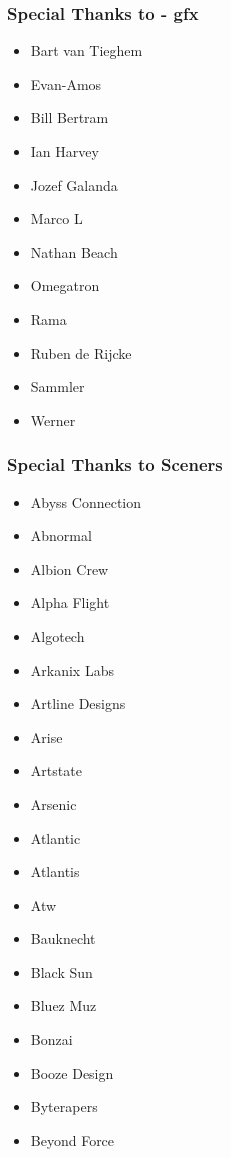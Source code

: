 
\begin{frame}[noframenumbering]
\frametitle{Special Thanks to - gfx}

\begin{multicols}{2}
\begin{itemize}
\item Bart van Tieghem
\item Evan-Amos
\item Bill Bertram
\item Ian Harvey
\item Jozef Galanda
\item Marco L
\item Nathan Beach
\item Omegatron
\item Rama
\item Ruben de Rijcke
\item Sammler
\item Werner
\end{itemize}
\end{multicols}

\end{frame}


\begin{frame}[noframenumbering]
\frametitle{Special Thanks to Sceners}

\begin{multicols}{3}
\begin{itemize}
\item Abyss Connection
\item Abnormal
\item Albion Crew
\item Alpha Flight
\item Algotech
\item Arkanix Labs
\item Artline Designs
\item Arise
\item Artstate
\item Arsenic
\item Atlantic
\item Atlantis
\item Atw
\item Bauknecht
\item Black Sun
\item Bluez Muz
\item Bonzai
\item Booze Design
\item Byterapers
\item Beyond Force
\end{itemize}
\end{multicols}

\end{frame}

